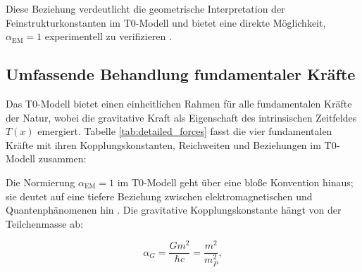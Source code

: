 \documentclass[twocolumn,aps,prl]{revtex4-2}
\begin{document}
	Diese Beziehung verdeutlicht die geometrische Interpretation der Feinstrukturkonstanten im T0-Modell und bietet eine direkte Möglichkeit, $\alpha_{\text{EM}} = 1$ experimentell zu verifizieren \cite{Webb2011}.
	
	\subsection{Umfassende Behandlung fundamentaler Kräfte}
	\label{subsec:detailed_forces}
	
	Das T0-Modell bietet einen einheitlichen Rahmen für alle fundamentalen Kräfte der Natur, wobei die gravitative Kraft als Eigenschaft des intrinsischen Zeitfeldes $T(x)$ emergiert. Tabelle \ref{tab:detailed_forces} fasst die vier fundamentalen Kräfte mit ihren Kopplungskonstanten, Reichweiten und Beziehungen im T0-Modell zusammen:
	
	\begin{table}[H]
		\centering
		\caption{Fundamentale Kräfte im T0-Modell mit ihren Kopplungskonstanten}
		\label{tab:detailed_forces}
		\small
		\setlength{\tabcolsep}{4pt}
	\end{table}
	
	Die Normierung $\alpha_{\text{EM}} = 1$ im T0-Modell geht über eine bloße Konvention hinaus; sie deutet auf eine tiefere Beziehung zwischen elektromagnetischen und Quantenphänomenen hin \cite{Sommerfeld1916, Aoyama2018}. Die gravitative Kopplungskonstante hängt von der Teilchenmasse ab:
	
	\begin{equation}
		\alpha_G = \frac{G m^2}{\hbar c} = \frac{m^2}{m_P^2}, \label{eq:alpha_G}
	\end{equation}
	
\end{document}
